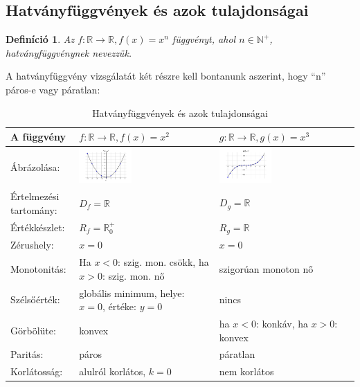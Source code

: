 \documentclass[12pt,a4paper]{article}
\newtheorem{definition}{Definíció} [section]
\begin{document}
\subsection{Hatványfüggvények és azok tulajdonságai}
\begin{definition}
Az $f:\mathbb{R}\rightarrow\mathbb{R}, f(x)=x^n$ függvényt, ahol $n\in \mathbb{N}^+$, hatványfüggvénynek nevezzük.
\end{definition}
A hatványfüggvény vizsgálatát két részre kell bontanunk aszerint, hogy ``n'' páros-e vagy páratlan:
\begin{table}[h!]
\centering
\begin{tabular}{ | m{3cm} || m{6cm} | m{6cm} | }
A függvény & $f:\mathbb{R}\rightarrow\mathbb{R}, f(x)=x^2$ & $g:\mathbb{R}\rightarrow\mathbb{R}, g(x)=x^3$ \\
\hline
Ábrázolása: &\centering \includegraphics[width=0.4\textwidth]{chart/2021-10-31--10:23:29} & \includegraphics[width=0.4\textwidth]{chart/2021-10-31--10:27:55}\\
\hline
Értelmezési tartomány: & $D_f=\mathbb{R}$ & $D_g=\mathbb{R}$ \\
\hline
Értékkészlet: & $R_f=\mathbb{R}_0^+$ & $R_g=\mathbb{R}$\\
\hline
Zérushely: & $x = 0$& $x = 0$\\
\hline
Monotonitás: &Ha $x<0$: szig. mon. csökk, ha $x>0$: szig. mon. nő&szigorúan monoton nő \\
\hline
Szélsőérték: & globális minimum, helye: $x=0$, értéke: $y=0$ & nincs\\
\hline
Görbölüte: & konvex & ha $x < 0$: konkáv, ha $x > 0$: konvex\\
\hline
Paritás: & páros & páratlan \\
\hline
Korlátosság: & alulról korlátos, $k=0$ & nem korlátos \\
\end{tabular}
\caption{Hatványfüggvények és azok tulajdonságai}
\label{table:hatv_fugg}
\end{table}
\end{document}
